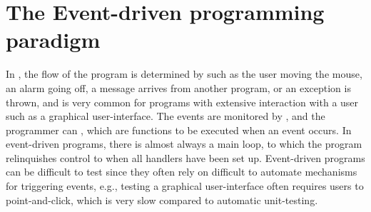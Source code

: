 \chapter{The Event-driven programming paradigm}
\label{chap:eventDriven}

In , the flow of the program is determined by  such as the user moving the mouse, an alarm going off, a message arrives from another program, or an exception is thrown, and is very common for programs with extensive interaction with a user such as a graphical user-interface. The events are monitored by , and the programmer can , which are  functions to be executed when an event occurs. In event-driven programs, there is almost always a main loop, to which the program relinquishes control to when all handlers have been set up. Event-driven programs can be difficult to test since they often rely on difficult to automate mechanisms for triggering events, e.g., testing a graphical user-interface often requires users to point-and-click, which is very slow compared to automatic unit-testing.

